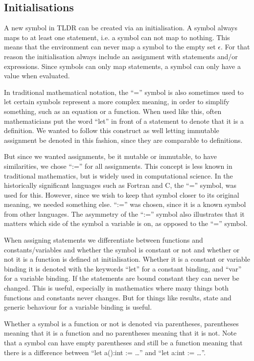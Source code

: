 \subsection{Initialisations}\label{subsec:initialisations}
A new symbol in TLDR can be created via an initialisation. A symbol always maps to at least one statement, i.e. a symbol can not map to nothing. This means that the environment can never map a symbol to the empty set $\epsilon$. For that reason the initialisation always include an assignment with statements and/or expressions. Since symbols can only map statements, a symbol can only have a value when evaluated.

In traditional mathematical notation, the \enquote{=} symbol is also sometimes used to let certain symbols represent a more complex meaning, in order to simplify something, such as an equation or a function. When used like this, often mathematicians put the word \enquote{let} in front of a statement to denote that it is a definition. We wanted to follow this construct as well letting immutable assignment be denoted in this fashion, since they are comparable to definitions. 

But since we wanted assignments, be it mutable or immutable, to have similarities, we chose \enquote{:=} for all assignments. This concept is less known in traditional mathematics, but is widely used in computational science. In the historically significant languages such as Fortran and C, the \enquote{=} symbol, was used for this. However, since we wish to keep that symbol closer to its original meaning, we needed something else. \enquote{:=} was chosen, since it is a known symbol from other languages. The asymmetry of the \enquote{:=} symbol also illustrates that it matters which side of the symbol a variable is on, as opposed to the \enquote{=} symbol.

When assigning statements we differentiate between functions and constants/variables and whether the symbol is constant or not and whether or not it is a function is defined at initialisation. Whether it is a constant or variable binding it is denoted with the keywords \enquote{let} for a constant binding, and \enquote{var} for a variable binding. If the statements are bound constant they can never be changed. This is useful, especially in mathematics where many things both functions and constants never changes. But for things like results, state and generic behaviour for a variable binding is useful.

Whether a symbol is a function or not is denoted via parentheses, parentheses meaning that it is a function and no parentheses meaning that it is not. Note that a symbol can have empty parentheses and still be a function meaning that there is a difference between \enquote{let a():int := \dots} and \enquote{let a:int := \dots}. 

